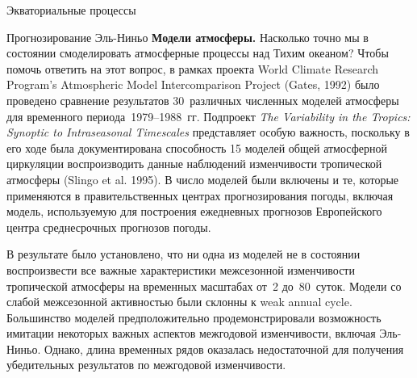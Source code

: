 \begin{chapter}{Экваториальные процессы}
\begin{section}{Прогнозирование Эль-Ниньо}
\textbf{Модели атмосферы.} Насколько точно мы в состоянии смоделировать
атмосферные процессы%
%
 над Тихим океаном? Чтобы помочь ответить
на этот вопрос, в рамках проекта World Climate Research Program's Atmospheric 
Model Intercomparison Project (Gates, 1992) было проведено сравнение 
результатов 30~различных численных моделей атмосферы для временного 
периода~1979--1988~гг. 
Подпроект \emph{The Variability in the Tropics: Synoptic to Intraseasonal 
Timescales} представляет особую важность, поскольку в его ходе была 
документирована способность 15 моделей общей атмосферной циркуляции 
воспроизводить данные наблюдений изменчивости тропической атмосферы
(Slingo et al. 1995). В число моделей были включены и те, которые применяются
в правительственных центрах прогнозирования погоды, включая модель,
используемую для построения ежедневных прогнозов Европейского центра
среднесрочных прогнозов погоды.
%

В результате было установлено, что ни одна из моделей не в состоянии 
воспроизвести все важные характеристики межсезонной изменчивости тропической
атмосферы на временных масштабах от~2 до~80~суток. Модели со слабой
межсезонной активностью были склонны к weak annual cycle. Большинство моделей
предположительно продемонстрировали возможность имитации некоторых важных
аспектов межгодовой изменчивости, включая Эль-Ниньо. Однако, длина временных
рядов оказалась недостаточной для получения убедительных результатов по
межгодовой изменчивости.
%


\end{section}
\end{chapter}
